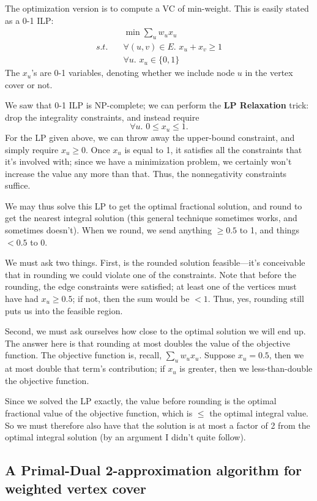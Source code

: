 \documentclass{article}
\begin{document}
The optimization version is to compute a VC of min-weight.
This is easily stated as a 0-1 ILP:
\begin{align}
& \min \sum_u w_u x_u \\
s.t.\quad & \forall (u,v)\in E.\,\, x_u + x_v \geq 1 \\
& \forall u.\,\, x_u \in \{0,1\}
\end{align}
The $x_u$'s are 0-1 variables, denoting whether we include node $u$ in the
vertex cover or not.

We saw that 0-1 ILP is NP-complete; we can perform the \textbf{LP Relaxation}
trick: drop the integrality constraints, and instead require
$$
\forall u.\,\, 0\leq x_u \leq 1.
$$
For the LP given above, we can throw away the upper-bound constraint, and
simply require $x_u \geq 0$.
Once $x_u$ is equal to 1, it satisfies all the constraints that it's involved
with; since we have a minimization problem, we certainly won't
increase the value any more than that.
Thus,  the nonnegativity constraints suffice.

We may thus solve this LP to get the optimal fractional solution, and
round to get the nearest integral solution (this general technique sometimes 
works, and sometimes doesn't).
When we round, we send anything $\geq 0.5$ to 1, and things $< 0.5$ to 0.

We must ask two things. First, is the
rounded solution feasible---it's conceivable that in rounding we could violate
one of the constraints.
Note that before the rounding, the edge constraints were satisfied; at least
one of the vertices must have had $x_u \geq 0.5$; if not, then the sum
would be $< 1$. Thus, yes, rounding still puts us into the feasible region.

Second, we must ask ourselves how close to the optimal solution we will end up.
The answer here is that rounding at most doubles the value of the objective
function.
The objective function is, recall, 
$\sum_u w_u x_u$.
Suppose $x_u = 0.5$, then we at most double that term's contribution; if $x_u$
is greater, then we less-than-double the objective function.

Since we solved the LP exactly, the value before rounding is the optimal
fractional value of the objective function, which is $\leq$ the optimal
integral value. So we must therefore also have that the solution is
at most a factor of 2 from the optimal integral solution (by an argument
I didn't quite follow).

\subsection{A Primal-Dual 2-approximation algorithm for weighted vertex cover}
\end{document}
